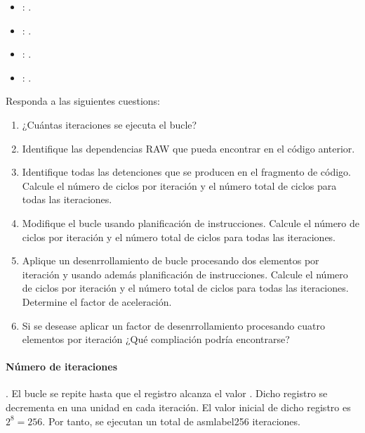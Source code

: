 \begin{itemize}
  \item {}: .
  \item {}: .
  \item {}: .
  \item {}: .
\end{itemize}

Responda a las siguientes cuestions:

\begin{enumerate}

\item ¿Cuántas iteraciones se ejecuta el bucle?

\item Identifique las dependencias RAW que pueda encontrar en el código
anterior.

\item Identifique todas las detenciones que se producen en el fragmento de código.
      Calcule el número de ciclos por iteración y el número total de ciclos
      para todas las iteraciones.

\item Modifique el bucle usando planificación de instrucciones.
      Calcule el número de ciclos por iteración y el número total de ciclos
      para todas las iteraciones.

\item Aplique un desenrrollamiento de bucle procesando dos elementos por
      iteración y usando además planificación de instrucciones.
      Calcule el número de ciclos por iteración y el número total de ciclos
      para todas las iteraciones.
      Determine el factor de aceleración.

\item Si se desease aplicar un factor de desenrrollamiento procesando cuatro
      elementos por iteración ¿Qué compliación podría encontrarse?

\end{enumerate}

\begin{acsolution}\end{acsolution}

\paragraph{Número de iteraciones}.
El bucle se repite hasta que el registro  alcanza el valor
. Dicho registro se decrementa en una unidad en cada iteración.
El valor inicial de dicho registro es $2^8 = 256$. Por tanto, se ejecutan
un total de asmlabel{256} iteraciones.

